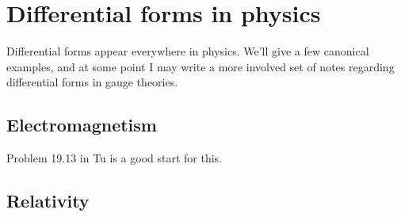 \newpage
\section{Differential forms in physics}

Differential forms appear everywhere in physics. We'll give a few canonical examples, and at some point I may write a more involved set of notes regarding differential forms in gauge theories. 

\subsection{Electromagnetism}

Problem 19.13 in Tu is a good start for this. 

\subsection{Relativity}

